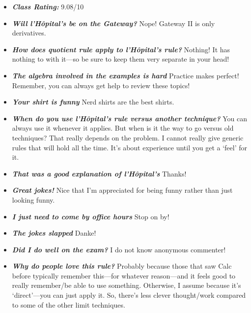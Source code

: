 \documentclass[11pt,letterpaper]{article}
\begin{document}
\begin{itemize}
\item {\bfseries\itshape Class Rating:} 9.08/10

\item {\bfseries\itshape  Will l'H\^{o}pital's be on the Gateway?} Nope! Gateway II is only derivatives. 

\item {\bfseries\itshape How does quotient rule apply to l'H\^{o}pital's rule?} Nothing! It has nothing to with it---so be sure to keep them very separate in your head!

\item {\bfseries\itshape The algebra involved in the examples is hard} Practice makes perfect! Remember, you can always get help to review these topics!

\item {\bfseries\itshape Your shirt is funny} Nerd shirts are the best shirts.

\item {\bfseries\itshape When do you use l'H\^{o}pital's rule versus another technique?} You can always use it whenever it applies. But when is it the way to go versus old techniques? That really depends on the problem. I cannot really give generic rules that will hold all the time. It's about experience until you get a `feel' for it.

\item {\bfseries\itshape That was a good explanation of l'H\^{o}pital's} Thanks!

\item {\bfseries\itshape Great jokes!} Nice that I'm appreciated for being funny rather than just looking funny.

\item {\bfseries\itshape I just need to come by office hours} Stop on by! 

\item {\bfseries\itshape The jokes slapped} Danke!

\item {\bfseries\itshape Did I do well on the exam?} I do not know anonymous commenter! 

\item {\bfseries\itshape Why do people love this rule?} Probably because those that saw Calc before typically remember this---for whatever reason---and it feels good to really remember/be able to use something. Otherwise, I assume because it's `direct'---you can just apply it. So, there's less clever thought/work compared to some of the other limit techniques.


\end{itemize}
\end{document}
